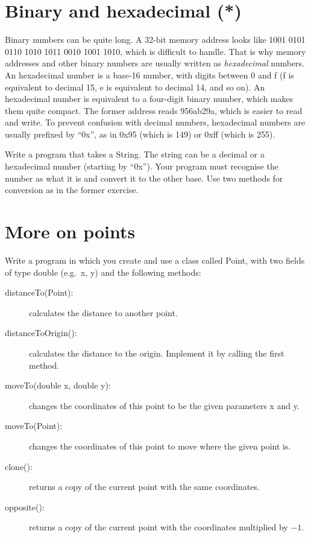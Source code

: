 \documentclass{article}
\begin{document}
\section{Binary and hexadecimal (*)}
\label{sec:c}

Binary numbers can be quite long. A 32-bit memory address looks like
1001 0101 0110 1010 1011 0010 1001 1010, which is difficult to
handle. That is why memory addresses and other binary numbers are
usually written as \emph{hexadecimal} numbers. An hexadecimal number
is a base-16 number, with digits between 0 and f (f is equivalent to
decimal 15, e is equivalent to decimal 14, and so on). An hexadecimal
number is equivalent to a four-digit binary number, which makes them
quite compact. The former address reads 956ab29a, which is easier to
read and write. To prevent confusion with decimal numbers, hexadecimal
numbers are usually prefixed by ``0x'', as in 0x95 (which is 149) or
0xff (which is 255). 

Write a program that takes a String. The string can be a decimal or a
hexadecimal number (starting by ``0x''). Your program must recognise
the number as what it is and convert it to the other base. Use two
methods for conversion as in the former exercise. 

\section{More on points}
\label{sec:more-points}

Write a program in which you create and use a class called Point, 
with two fields of type double (e.g.~x, y) and the
following methods: 

\begin{description}
\item[distanceTo(Point): ] calculates the distance to another point.
\item[distanceToOrigin(): ] calculates the distance to the
  origin. Implement it by calling the first method.
\item[moveTo(double x, double y): ] changes the coordinates of this point to
  be the given parameters x and y. 
\item[moveTo(Point): ] changes the coordinates of this point to move
  where the given point is.
\item[clone(): ] returns a copy of the current point with the same
  coordinates.
\item[opposite(): ] returns a copy of the current point with the
  coordinates multiplied by $-1$. 
\end{description}
\end{document}
